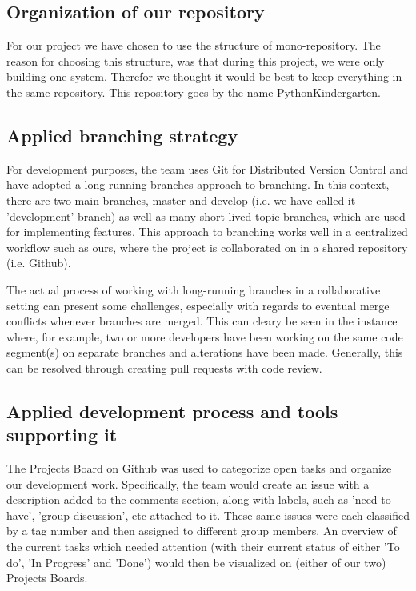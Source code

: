 \subsection{Organization of our repository}
For our project we have chosen to use the structure of mono-repository. The reason for choosing this structure, was that during this project, we were only building one system. Therefor we thought it would be best to keep everything in the same repository. This repository goes by the name PythonKindergarten. \newline

\subsection{Applied branching strategy}
For development purposes, the team uses Git for Distributed Version Control and have adopted a long-running branches approach to branching. In this context, there are two main branches, master and develop (i.e. we have called it 'development' branch) as well as many short-lived topic branches, which are used for implementing features. This approach to branching works well in a centralized workflow such as ours, where the project is collaborated on in a shared repository (i.e. Github).

The actual process of working with long-running branches in a collaborative setting can present some challenges, especially with regards to eventual merge conflicts whenever branches are merged. This can cleary be seen in the instance where, for example, two or more developers have been working on the same code segment(s) on separate branches and alterations have been made. Generally, this can be resolved through creating pull requests with code review.

\subsection{Applied development process and tools supporting it}
The Projects Board on Github was used to categorize open tasks and organize our development work. Specifically, the team would create an issue with a description added to the comments section, along with labels, such as 'need to have', 'group discussion', etc attached to it. These same issues were each classified by a tag number and then assigned to different group members. An overview of the current tasks which needed attention (with their current status of either 'To do', 'In Progress' and 'Done') would then be visualized on (either of our two) Projects Boards.


